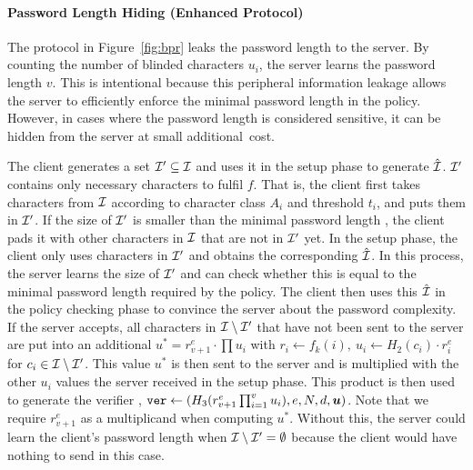 \paragraph{Password Length Hiding (Enhanced Protocol)} 
The protocol in Figure~\ref{fig:bpr} leaks the password length to the server. By counting the number of blinded characters $u_i$, the server learns the password length $v$. 
This is intentional because this peripheral information leakage allows the server to efficiently enforce the minimal password length in the policy. 
However, in cases where the password length is considered sensitive, it can be hidden from the  server at small additional~cost.

The client generates a set $\mathcal{I}'\subseteq\mathcal{I}$ and uses it in the setup phase to generate $\hat{\mathcal{I}}$. 
$\mathcal{I}'$ contains only necessary characters to fulfil $f$. 
That is, the client first takes characters from $\mathcal{I}$ according to character class $A_i$ and threshold $t_i$, and puts them in $\mathcal{I}'$.
If the size of $\mathcal{I}'$ is smaller than the minimal password length \pmin, the client pads it with other characters in $\mathcal{I}$ that are not in $\mathcal{I}'$ yet. 
In the setup phase, the client only uses characters in $\mathcal{I}'$ and obtains the corresponding $\hat{\mathcal{I}}$. In this process, the server learns the size of $\mathcal{I}'$ and can check whether this is equal to the minimal password length \pmin required by the policy. 
The client then uses this $\hat{\mathcal{I}}$ in the policy checking phase to convince the server about the password complexity. 
If the server accepts, all characters in $\mathcal{I}\setminus\mathcal{I}'$ that have not been sent to the server are put into an additional $u^\ast=r_{v+1}^e\cdot\prod u_i$ with $r_i\gets f_k(i),~ u_i\gets H_2(c_i)\cdot r_i^e$ for $c_i\in\mathcal{I}\setminus\mathcal{I}'$. 
This value $u^\ast$ is then sent to the server and is multiplied with the other $u_i$ values the server received in the setup phase.
This product is then used to generate the verifier \ver, \ie $\mathtt{ver}\gets(H_3(r_{v+1}^e\prod_{i=1}^v u_i), e, N, d, \bm{u})$. 
Note that we require $r_{v+1}^e$ as a multiplicand when computing $u^\ast$. 
Without this, the server could learn the client's password length when $\mathcal{I}\setminus\mathcal{I}'=\emptyset$ because the client would have nothing to send in this case. 

